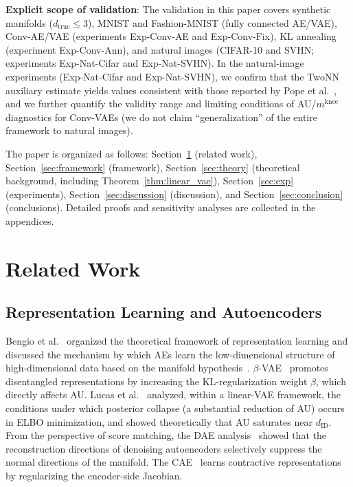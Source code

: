 \documentclass[make,article,submit,pdftex,moreauthors]{Definitions/mdpi}
\newcommand{\mknee}{m^{\mathrm{knee}}}
\begin{document}
\textbf{Explicit scope of validation}:
The validation in this paper covers synthetic manifolds
($d_{\mathrm{true}} \leq 3$), MNIST and Fashion-MNIST (fully connected AE/VAE),
Conv-AE/VAE (experiments Exp-Conv-AE and Exp-Conv-Fix), KL annealing
(experiment Exp-Conv-Ann),
and natural images (CIFAR-10 and SVHN; experiments Exp-Nat-Cifar and Exp-Nat-SVHN).
In the natural-image experiments (Exp-Nat-Cifar and Exp-Nat-SVHN), we confirm
that the TwoNN auxiliary estimate yields values consistent with those reported
by Pope et al.~\cite{pope2021intrinsic}, and we further quantify the validity
range and limiting conditions of AU/$\mknee$ diagnostics for Conv-VAEs
(we do not claim ``generalization'' of the entire framework to natural images).

The paper is organized as follows:
Section~\ref{sec:related} (related work), Section~\ref{sec:framework} (framework),
Section~\ref{sec:theory} (theoretical background, including Theorem~\ref{thm:linear_vae}),
Section~\ref{sec:exp} (experiments), Section~\ref{sec:discussion} (discussion),
and Section~\ref{sec:conclusion} (conclusions).
Detailed proofs and sensitivity analyses are collected in the appendices.

\section{Related Work}\label{sec:related}

\subsection{Representation Learning and Autoencoders}\label{sec:related_ae}

Bengio et al.~\cite{bengio2013representation} organized the theoretical
framework of representation learning and discussed the mechanism by which AEs
learn the low-dimensional structure of high-dimensional data based on the
manifold hypothesis~\cite{fefferman2016manifold}.
$\beta$-VAE~\cite{higgins2017betavae} promotes disentangled representations by
increasing the KL-regularization weight $\beta$, which directly affects AU.
Lucas et al.~\cite{lucas2019elbo} analyzed, within a linear-VAE framework, the
conditions under which posterior collapse (a substantial reduction of AU)
occurs in ELBO minimization, and showed theoretically that AU saturates near
$d_{\mathrm{ID}}$.
From the perspective of score matching, the DAE analysis~\cite{alain2014dae}
showed that the reconstruction directions of denoising autoencoders selectively
suppress the normal directions of the manifold.
The CAE~\cite{rifai2011cae} learns contractive representations by regularizing
the encoder-side Jacobian.
\end{document}
